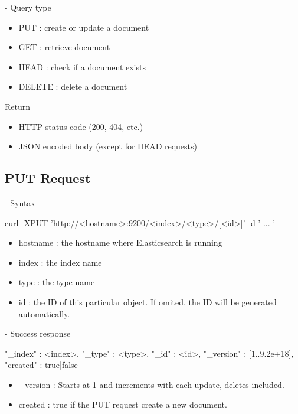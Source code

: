 \documentclass[]{beamer}
\begin{document}
\begin{frame}{\secname{} - Query type}
  \begin{itemize}
    \item PUT : create or update a document
    \item GET : retrieve document
    \item HEAD : check if a document exists
    \item DELETE : delete a document
  \end{itemize}

  Return
  \begin{itemize}
    \item HTTP status code (200, 404, etc.)
    \item JSON encoded body (except for HEAD requests)
  \end{itemize}
\end{frame}

\subsection{PUT Request}

\begin{frame}[containsverbatim]{\subsecname{} - Syntax}
  \begin{command}
curl -XPUT 'http://<hostname>:9200/<index>/<type>/[<id>]' -d '
{
    ...
}'
  \end{command}

  \begin{itemize}
    \item hostname : the hostname where Elasticsearch is running
    \item index : the index name
    \item type : the type name
    \item id : the ID of this particular object. If omited, the ID will be generated automatically.
  \end{itemize}
\end{frame}

\begin{frame}[containsverbatim]{\subsecname{} - Success response}
  \begin{command}
{
  "_index" : <index>,
  "_type" : <type>,
  "_id" : <id>,
  "_version" : [1..9.2e+18],
  "created" : true|false
}
  \end{command}

  \begin{itemize}
    \item \_version : Starts at 1 and increments with each update, deletes included.
    \item created : true if the PUT request create a new document.
  \end{itemize}
\end{frame}
\end{document}
